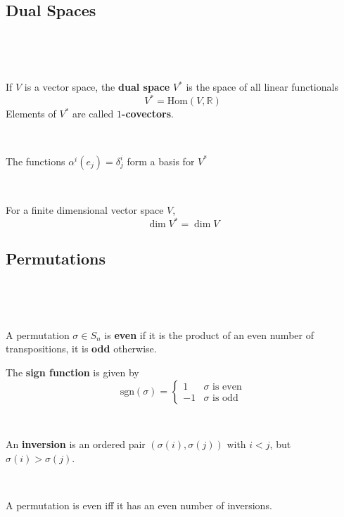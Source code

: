\documentclass{article}
\begin{document}
\subsection{Dual Spaces}
\

\begin{definition}
  \

  If $V$ is a vector space, the \textbf{dual space} $V^*$ is the space of all linear functionals $$V^* = \text{Hom}(V, \mathbb{R})$$Elements of $V^*$ are called \textbf{$1$-covectors}.
\end{definition}

\begin{proposition}
  \

  The functions $\alpha^i(e_j) = \delta^i_j$ form a basis for $V^*$
\end{proposition}

\begin{corollary}
  \

  For a finite dimensional vector space $V$, $$\dim V^* = \dim V$$
\end{corollary}

\subsection{Permutations}
\

\begin{definition}
  \

  A permutation $\sigma \in S_n$ is \textbf{even} if it is the product of an even number of transpositions, it is \textbf{odd} otherwise.

  The \textbf{sign function} is given by $$\text{sgn}(\sigma) =
  \begin{cases}
    1 & \sigma \text{ is even}\\
    -1 & \sigma \text{ is odd}
  \end{cases} $$
\end{definition}

\begin{definition}[Inversions]
  \

  An \textbf{inversion} is an ordered pair $(\sigma(i), \sigma(j))$ with $i<j$, but $\sigma(i) >\sigma(j)$.
\end{definition}

\begin{proposition}
  \

  A permutation is even iff it has an even number of inversions.
\end{proposition}
\end{document}
